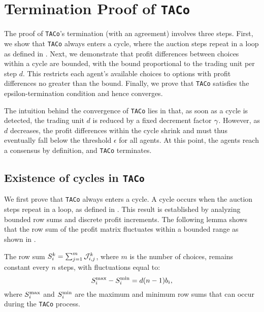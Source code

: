 \section{Termination Proof of \texttt{TACo}} \label{sec:proof}

The proof of \texttt{TACo}'s termination (with an agreement) involves three steps. First, we show that \texttt{TACo} always enters a cycle, where the auction steps repeat in a loop as defined in . Next, we demonstrate that profit differences between choices within a cycle are bounded, with the bound proportional to the trading unit per step $d$. This restricts each agent’s available choices to options with profit differences no greater than the bound. Finally, we prove that \texttt{TACo} satisfies the epsilon-termination condition and hence converges. 

The intuition behind the convergence of \texttt{TACo} lies in that, as soon as a cycle is detected, the trading unit $d$ is reduced by a fixed decrement factor $\gamma$. However, as $d$ decreases, the profit differences within the cycle shrink and must thus eventually fall below the threshold $\epsilon$ for all agents. At this point, the agents reach a consensus by definition, and \texttt{TACo} terminates.

\begin{figure}[hbt!]
    
\end{figure}

\subsection{Existence of cycles in \texttt{TACo}}
We first prove that \texttt{TACo} always enters a cycle. A cycle occurs when the auction steps repeat in a loop, as defined in . This result is established by analyzing bounded row sums and discrete profit increments. The following lemma shows that the row sum of the profit matrix fluctuates within a bounded range as shown in .

\begin{lemma} \label{theorem:lemma1}
The row sum $S_i^k = \sum_{j=1}^m \mathcal{J}_{i,j}^k$, where $m$ is the number of choices, remains constant every $n$ steps, with fluctuations equal to:
\begin{equation}
    S_i^{\mathrm{max}} - S_i^{\mathrm{min}} = d(n-1)b_i,
\end{equation}
where $S_i^{\mathrm{max}}$ and $S_i^{\mathrm{min}}$ are the maximum and minimum row sums that can occur during the \texttt{TACo} process.
\end{lemma}

